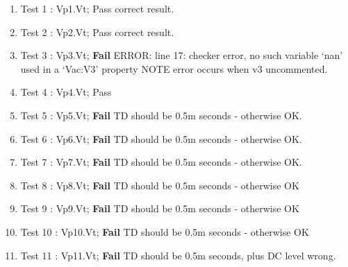 \begin{enumerate}
 \item Test 1  : Vp1.Vt;  Pass correct result.
 \item Test 2  : Vp2.Vt;  Pass correct result.
 \item Test 3  : Vp3.Vt;  \textbf{Fail} ERROR: line 17: checker error, no such variable `nan' used in a `Vac:V3' property  NOTE error occurs when v3 uncommented.
 \item Test 4  : Vp4.Vt;  Pass
 \item Test 5  : Vp5.Vt;  \textbf{Fail} TD should be 0.5m seconds - otherwise OK.
 \item Test 6  : Vp6.Vt;  \textbf{Fail} TD should be 0.5m seconds - otherwise OK.
 \item Test 7  : Vp7.Vt;  \textbf{Fail} TD should be 0.5m seconds - otherwise OK.
 \item Test 8  : Vp8.Vt;  \textbf{Fail} TD should be 0.5m seconds - otherwise OK
 \item Test 9  : Vp9.Vt;  \textbf{Fail} TD should be 0.5m seconds - otherwise OK
 \item Test 10 : Vp10.Vt;  \textbf{Fail} TD should be 0.5m seconds - otherwise OK
 \item Test 11 : Vp11.Vt;  \textbf{Fail} TD should be 0.5m seconds, plus DC level wrong.
\end{enumerate}




